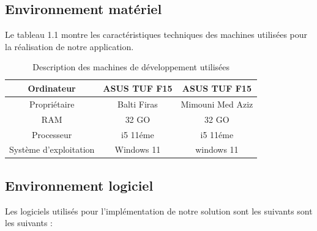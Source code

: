\subsection{Environnement matériel}
\noindent Le tableau 1.1 montre les caractéristiques techniques des machines utilisées pour la réalisation de notre application.
\bigskip
\begin{table}[htbp]
    \renewcommand{\arraystretch}{1.9}
    \centering
    \begin{tabular}{|c|c|c|}
        \hline
        Ordinateur             & ASUS TUF F15 & ASUS TUF F15     \\
        \hline
        Propriétaire           & Balti Firas  & Mimouni Med Aziz \\
        \hline
        RAM                    & 32 GO        & 32 GO            \\
        \hline
        Processeur             & i5 11éme     & i5 11éme         \\
        \hline
        Système d’exploitation & Windows 11   & windows 11       \\
        \hline
    \end{tabular}
    \bigskip
    \caption{Description des machines de développement utilisées}

\end{table}
\subsection{ Environnement logiciel }

\noindent Les logiciels utilisés pour l’implémentation de notre solution sont les suivants sont les suivants :

